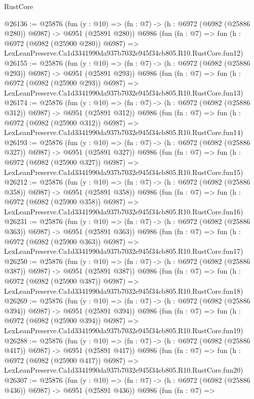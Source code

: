 \begin{lexlean}{RustCore}
\begin{coremodule}
@26136 := @25876
    (fun (y : @10) => (fn : @7) -> (h : @6972 (@6982 (@25886 @280)) @6987) -> @6951 (@25891 @280))
    @6986
    (fun (fn : @7) =>
    fun (h : @6972 (@6982 (@25900 @280)) @6987) =>
    LexLeanPreserve.Ca1d3341990da937b7032e945f34cb805.R10.RustCore.fun12)
@26155 := @25876
    (fun (y : @10) => (fn : @7) -> (h : @6972 (@6982 (@25886 @293)) @6987) -> @6951 (@25891 @293))
    @6986
    (fun (fn : @7) =>
    fun (h : @6972 (@6982 (@25900 @293)) @6987) =>
    LexLeanPreserve.Ca1d3341990da937b7032e945f34cb805.R10.RustCore.fun13)
@26174 := @25876
    (fun (y : @10) => (fn : @7) -> (h : @6972 (@6982 (@25886 @312)) @6987) -> @6951 (@25891 @312))
    @6986
    (fun (fn : @7) =>
    fun (h : @6972 (@6982 (@25900 @312)) @6987) =>
    LexLeanPreserve.Ca1d3341990da937b7032e945f34cb805.R10.RustCore.fun14)
@26193 := @25876
    (fun (y : @10) => (fn : @7) -> (h : @6972 (@6982 (@25886 @327)) @6987) -> @6951 (@25891 @327))
    @6986
    (fun (fn : @7) =>
    fun (h : @6972 (@6982 (@25900 @327)) @6987) =>
    LexLeanPreserve.Ca1d3341990da937b7032e945f34cb805.R10.RustCore.fun15)
@26212 := @25876
    (fun (y : @10) => (fn : @7) -> (h : @6972 (@6982 (@25886 @358)) @6987) -> @6951 (@25891 @358))
    @6986
    (fun (fn : @7) =>
    fun (h : @6972 (@6982 (@25900 @358)) @6987) =>
    LexLeanPreserve.Ca1d3341990da937b7032e945f34cb805.R10.RustCore.fun16)
@26231 := @25876
    (fun (y : @10) => (fn : @7) -> (h : @6972 (@6982 (@25886 @363)) @6987) -> @6951 (@25891 @363))
    @6986
    (fun (fn : @7) =>
    fun (h : @6972 (@6982 (@25900 @363)) @6987) =>
    LexLeanPreserve.Ca1d3341990da937b7032e945f34cb805.R10.RustCore.fun17)
@26250 := @25876
    (fun (y : @10) => (fn : @7) -> (h : @6972 (@6982 (@25886 @387)) @6987) -> @6951 (@25891 @387))
    @6986
    (fun (fn : @7) =>
    fun (h : @6972 (@6982 (@25900 @387)) @6987) =>
    LexLeanPreserve.Ca1d3341990da937b7032e945f34cb805.R10.RustCore.fun18)
@26269 := @25876
    (fun (y : @10) => (fn : @7) -> (h : @6972 (@6982 (@25886 @394)) @6987) -> @6951 (@25891 @394))
    @6986
    (fun (fn : @7) =>
    fun (h : @6972 (@6982 (@25900 @394)) @6987) =>
    LexLeanPreserve.Ca1d3341990da937b7032e945f34cb805.R10.RustCore.fun19)
@26288 := @25876
    (fun (y : @10) => (fn : @7) -> (h : @6972 (@6982 (@25886 @417)) @6987) -> @6951 (@25891 @417))
    @6986
    (fun (fn : @7) =>
    fun (h : @6972 (@6982 (@25900 @417)) @6987) =>
    LexLeanPreserve.Ca1d3341990da937b7032e945f34cb805.R10.RustCore.fun20)
@26307 := @25876
    (fun (y : @10) => (fn : @7) -> (h : @6972 (@6982 (@25886 @436)) @6987) -> @6951 (@25891 @436))
    @6986
    (fun (fn : @7) =>

\end{coremodule}
\end{lexlean}
